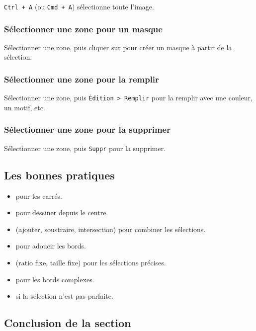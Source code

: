 \texttt{Ctrl + A} (ou \texttt{Cmd + A}) sélectionne toute l'image.

\subsubsection{Sélectionner une zone pour un masque}

Sélectionner une zone, puis cliquer sur  pour créer un masque à partir de la sélection.

\subsubsection{Sélectionner une zone pour la remplir}

Sélectionner une zone, puis \texttt{Édition > Remplir} pour la remplir avec une couleur, un motif, etc.

\subsubsection{Sélectionner une zone pour la supprimer}

Sélectionner une zone, puis \texttt{Suppr} pour la supprimer.

\subsection{Les bonnes pratiques}

\begin{itemize}
    \item {} pour les carrés.
    \item {} pour dessiner depuis le centre.
    \item {} (ajouter, soustraire, intersection) pour combiner les sélections.
    \item {} pour adoucir les bords.
    \item {} (ratio fixe, taille fixe) pour les sélections précises.
    \item {} pour les bords complexes.
    \item {} si la sélection n'est pas parfaite.
\end{itemize}

\subsection*{Conclusion de la section}

